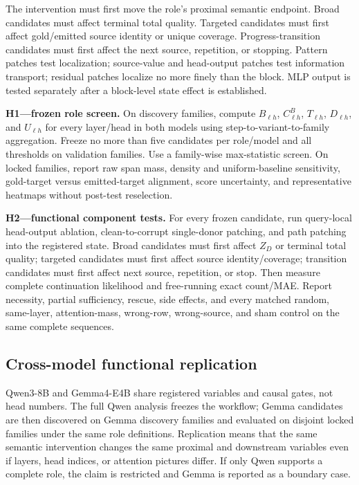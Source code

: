 The intervention must first move the role's proximal semantic endpoint.
Broad candidates must affect terminal total quality. Targeted candidates must
first affect gold/emitted source identity or unique coverage.
Progress-transition candidates must first affect the next source, repetition,
or stopping. Pattern patches test localization; source-value and head-output
patches test information transport; residual patches localize no more finely
than the block. MLP output is tested separately after a block-level state
effect is established.

\begin{todobox}
\textbf{H1---frozen role screen.}
On discovery families, compute \(B_{\ell h}\), \(C_{\ell h}^B\),
\(T_{\ell h}\), \(D_{\ell h}\), and \(U_{\ell h}\) for every layer/head in
both models using step-to-variant-to-family aggregation. Freeze no more than
five candidates per role/model and all thresholds on validation families.
Use a family-wise max-statistic screen. On locked families, report raw span
mass, density and uniform-baseline sensitivity, gold-target versus
emitted-target alignment, score uncertainty, and representative heatmaps
without post-test reselection.
\end{todobox}

\begin{todobox}
\textbf{H2---functional component tests.}
For every frozen candidate, run query-local head-output ablation,
clean-to-corrupt single-donor patching, and path patching into the registered
state. Broad candidates must first affect \(Z_D\) or terminal total quality;
targeted candidates must first affect source identity/coverage; transition
candidates must first affect next source, repetition, or stop. Then measure
complete continuation likelihood and free-running exact count/MAE. Report
necessity, partial sufficiency, rescue, side effects, and every matched random,
same-layer, attention-mass, wrong-row, wrong-source, and sham control on the
same complete sequences.
\end{todobox}

\subsection{Cross-model functional replication}

Qwen3-8B and Gemma4-E4B share registered variables and causal gates, not head
numbers. The full Qwen analysis freezes the workflow; Gemma candidates are
then discovered on Gemma discovery families and evaluated on disjoint locked
families under the same role definitions. Replication means that the same
semantic intervention changes the same proximal and downstream variables even
if layers, head indices, or attention pictures differ. If only Qwen supports a
complete role, the claim is restricted and Gemma is reported as a boundary
case.
